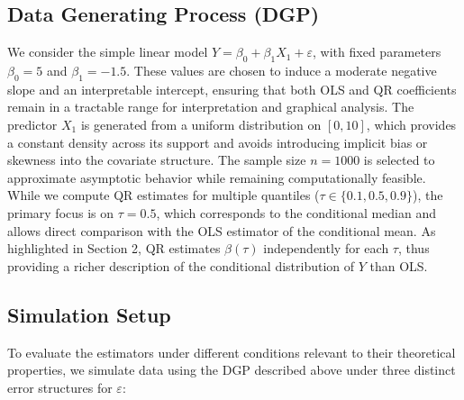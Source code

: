 \documentclass[fleqn,10pt]{latex/stylish_article} %
\begin{document}
\subsection{Data Generating Process (DGP)}\label{data-generating-process-dgp}

We consider the simple linear model \(Y = \beta_0 + \beta_1 X_1 + \varepsilon\), with fixed parameters \(\beta_0 = 5\) and \(\beta_1 = -1.5\). These values are chosen to induce a moderate negative slope and an interpretable intercept, ensuring that both OLS and QR coefficients remain in a tractable range for interpretation and graphical analysis. The predictor \(X_1\) is generated from a uniform distribution on \([0,10]\), which provides a constant density across its support and avoids introducing implicit bias or skewness into the covariate structure. The sample size \(n = 1000\) is selected to approximate asymptotic behavior while remaining computationally feasible. While we compute QR estimates for multiple quantiles (\(\tau \in \{0.1, 0.5, 0.9\}\)), the primary focus is on \(\tau = 0.5\), which corresponds to the conditional median and allows direct comparison with the OLS estimator of the conditional mean. As highlighted in Section 2, QR estimates \(\beta(\tau)\) independently for each \(\tau\), thus providing a richer description of the conditional distribution of \(Y\) than OLS.

\subsection{Simulation Setup}\label{simulation-setup}

To evaluate the estimators under different conditions relevant to their theoretical properties, we simulate data using the DGP described above under three distinct error structures for \(\varepsilon\):
\end{document}
